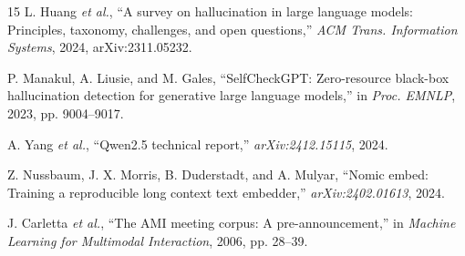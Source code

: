 \documentclass[conference]{IEEEtran}
\begin{document}
\begin{thebibliography}{15}
 L. Huang \emph{et al.}, ``A survey on hallucination in large language models: Principles, taxonomy, challenges, and open questions,'' \emph{ACM Trans. Information Systems}, 2024, arXiv:2311.05232.

 P. Manakul, A. Liusie, and M. Gales, ``SelfCheckGPT: Zero-resource black-box hallucination detection for generative large language models,'' in \emph{Proc. EMNLP}, 2023, pp. 9004--9017.

 A. Yang \emph{et al.}, ``Qwen2.5 technical report,'' \emph{arXiv:2412.15115}, 2024.

 Z. Nussbaum, J. X. Morris, B. Duderstadt, and A. Mulyar, ``Nomic embed: Training a reproducible long context text embedder,'' \emph{arXiv:2402.01613}, 2024.

 J. Carletta \emph{et al.}, ``The AMI meeting corpus: A pre-announcement,'' in \emph{Machine Learning for Multimodal Interaction}, 2006, pp. 28--39.

\end{thebibliography}
\end{document}
